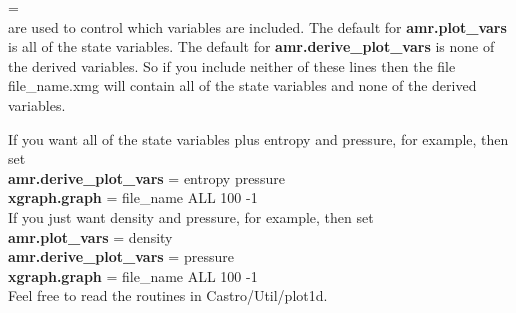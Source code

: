  = \\

\noindent are used to control which variables are included.  The default for {\bf amr.plot\_vars}
is all of the state variables.  The default for {\bf amr.derive\_plot\_vars} is none of
the derived variables.  So if you include neither of these lines then the file 
file\_name.xmg will contain all of the state variables and none of the derived variables.

If you want all of the state variables plus entropy and pressure, for example, then set \\

{\bf amr.derive\_plot\_vars} = entropy pressure \\

{\bf xgraph.graph} = file\_name ALL 100 -1\\

If you just want density and pressure, for example, then set \\

{\bf amr.plot\_vars} =  density \\

{\bf amr.derive\_plot\_vars} = pressure \\

{\bf xgraph.graph} = file\_name ALL 100 -1\\ 

Feel free to read the routines in Castro/Util/plot1d.
